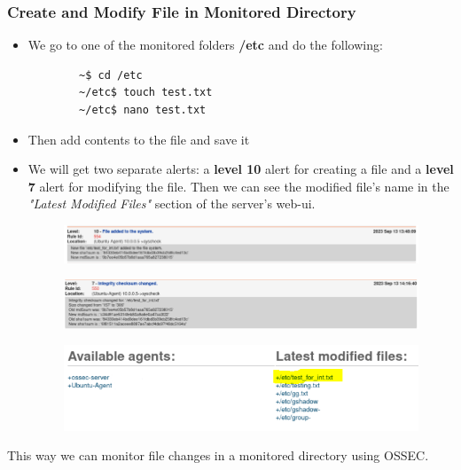 \documentclass{article}
\begin{document}
\subsubsection{Create and Modify File in Monitored Directory}
\begin{itemize}
    \item We go to one of the monitored folders \textbf{/etc } and do the following:
    {
    \color{orange}%
    \begin{verbatim}
        ~$ cd /etc
        ~/etc$ touch test.txt
        ~/etc$ nano test.txt
    \end{verbatim}
    }
    \item Then add contents to the file and save it
    \item We will get two separate alerts: a \textbf{level 10} alert for creating a file and a \textbf{level 7} alert for modifying the file. Then we can see the modified file's name in the \textit{"Latest Modified Files" } section of the server's web-ui.
    \begin{figure}[hbt!]
        \centering
        \includegraphics{img-fileAdd.PNG}
    \end{figure}
    \begin{figure}[hbt!]
        \centering
        \includegraphics{img-checksum.PNG}
    \end{figure}
    \begin{figure}[hbt!]
        \centering
        \includegraphics{img-latest.PNG}
    \end{figure}
\end{itemize}
This way we can monitor file changes in a monitored directory using OSSEC.

\vspace{1cm}
\end{document}
